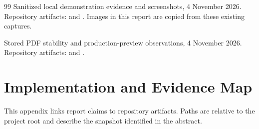 \documentclass[11pt,a4paper]{report}
\begin{document}
\begin{thebibliography}{99}
Sanitized local demonstration evidence and screenshots, 4 November 2026. Repository artifacts:  and . Images in this report are copied from these existing captures.

Stored PDF stability and production-preview observations, 4 November 2026. Repository artifacts:  and .
\end{thebibliography}

\appendix
\chapter{Implementation and Evidence Map}
This appendix links report claims to repository artifacts. Paths are relative to the project root and describe the snapshot identified in the abstract.
\end{document}
